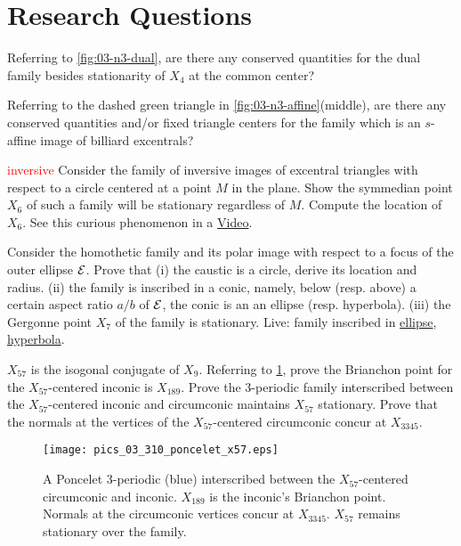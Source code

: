 \section{Research Questions}

\begin{question}
Referring to \cref{fig:03-n3-dual}, are there any conserved quantities for the dual family besides stationarity of $X_4$ at the common center?
\end{question}

\begin{question}
Referring to  the dashed green triangle in \cref{fig:03-n3-affine}(middle), are there any conserved quantities and/or fixed triangle centers for the family which is an $s$-affine image of billiard excentrals?
\end{question}

\begin{question}
\textcolor{red}{inversive}
Consider the family of inversive images of excentral triangles with respect to a circle centered at a point $M$ in the plane. Show the symmedian point $X_6$ of such a family will be stationary regardless of $M$. Compute the location of $X_6$. See this curious phenomenon in a \href{https://youtu.be/wwX_QfkjVi0}{Video}.
\end{question}

\begin{question}
Consider the homothetic family and its polar image with respect to a focus of the outer ellipse $\mathcal{E}$. Prove that (i) the caustic is a circle, derive its location and radius. (ii) the family is inscribed in a conic, namely, below (resp. above) a certain aspect ratio $a/b$ of $\mathcal{E}$, the conic is an an ellipse (resp. hyperbola). (iii) the Gergonne point $X_7$ of the family is stationary.
Live: family inscribed in \href{https://bit.ly/33p7xj6}{ellipse}, \href{https://bit.ly/3bbTaTt}{hyperbola}.
\end{question}

\begin{question}
 $X_{57}$ is the isogonal conjugate of $X_9$. Referring to \cref{fig:03-x57}, prove the Brianchon point for the $X_{57}$-centered inconic is $X_{189}$. Prove the 3-periodic family interscribed between the $X_{57}$-centered inconic and circumconic maintains $X_{57}$ stationary. Prove that the normals at the vertices of the $X_{57}$-centered circumconic concur at $X_{3345}$. 
\label{que:03-x57}
\end{question}

\begin{figure}
    \centering
    \texttt{[image: pics\_03\_310\_poncelet\_x57.eps]}
    \caption{A Poncelet 3-periodic (blue) interscribed between the $X_{57}$-centered circumconic and inconic. $X_{189}$ is the inconic's Brianchon point. Normals at the circumconic vertices concur at $X_{3345}$. $X_{57}$ remains stationary over the family.}
    \label{fig:03-x57}
\end{figure}

